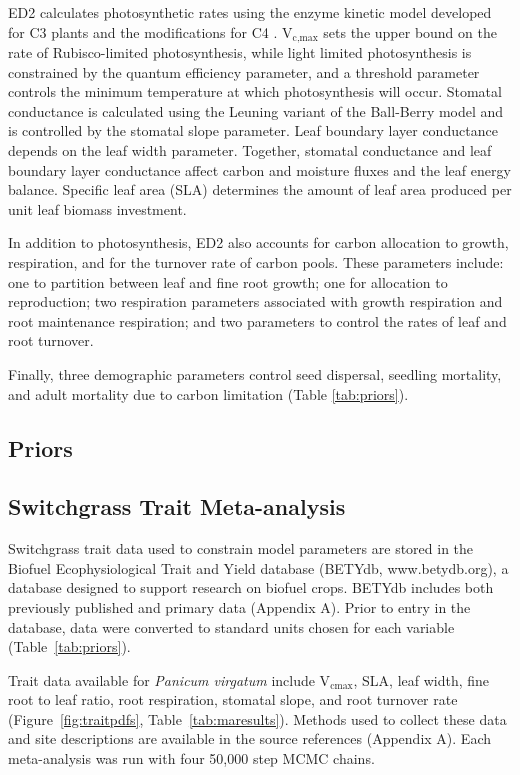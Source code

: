 \documentclass[12pt]{article}
\begin{document}
\begin{flushleft}
\begin{spacing}{1.9}
 ED2 calculates photosynthetic rates using the enzyme kinetic model developed for C3 plants \citep{farquhar1982scp,ball1987mps} and the modifications for C4 \citep{collatz1992cps}.
 V$_{\text{c,max}}$ sets the upper bound on the rate of Rubisco-limited photosynthesis, while light limited photosynthesis is constrained by the quantum efficiency parameter, and a threshold parameter controls the minimum temperature at which photosynthesis will occur.
 Stomatal conductance is calculated using the Leuning variant of the Ball-Berry model \citep{leuning1995cac} and is controlled by the stomatal slope parameter.
 Leaf boundary layer conductance depends on the leaf width parameter.
 Together, stomatal conductance and leaf boundary layer conductance affect carbon and moisture fluxes and the leaf energy balance.
 Specific leaf area (SLA) determines the amount of leaf area produced per unit leaf biomass investment.

 In addition to photosynthesis, ED2 also accounts for carbon allocation to growth, respiration, and for the turnover rate of carbon pools.
 These parameters include: one to partition between leaf and fine root growth; one for allocation to reproduction; two respiration parameters associated with growth respiration and root maintenance respiration; and two parameters to control the rates of leaf and root turnover.

 Finally, three demographic parameters control seed dispersal, seedling mortality, and adult mortality due to carbon limitation (Table \ref{tab:priors}).

\subsection*{Priors}



\subsection*{Switchgrass Trait Meta-analysis}
 Switchgrass trait data used to constrain model parameters are stored in the Biofuel Ecophysiological Trait and Yield database (BETYdb, www.betydb.org), a database designed to support research on biofuel crops.
 BETYdb includes both previously published and primary data (Appendix A).
 Prior to entry in the database, data were converted to standard units chosen for each variable (Table~\ref{tab:priors}).

 Trait data available for \emph{Panicum virgatum} include V$_{\text{cmax}}$, SLA, leaf width, fine root to leaf ratio, root respiration, stomatal slope, and root turnover rate (Figure~\ref{fig:traitpdfs}, Table~\ref{tab:maresults}).
 Methods used to collect these data and site descriptions are available in the source references (Appendix A).
 Each meta-analysis was run with four 50,000 step MCMC chains.


\end{spacing}
\end{flushleft}
\end{document}
